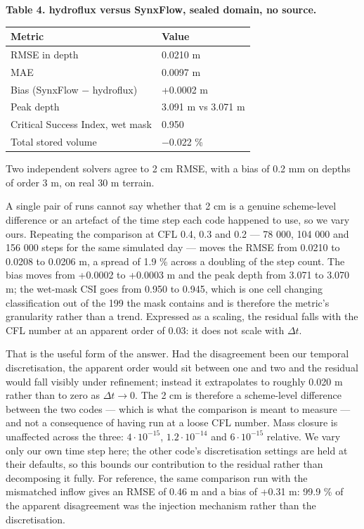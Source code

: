 \textbf{Table 4. hydroflux versus SynxFlow, sealed domain, no source.}

\begin{longtable}[]{@{}ll@{}}
\toprule\noalign{}
Metric & Value \\
\midrule\noalign{}
\endhead
\bottomrule\noalign{}
\endlastfoot
RMSE in depth & 0.0210 m \\
MAE & 0.0097 m \\
Bias (SynxFlow − hydroflux) & +0.0002 m \\
Peak depth & 3.091 m vs 3.071 m \\
Critical Success Index, wet mask & 0.950 \\
Total stored volume & −0.022 \% \\
\end{longtable}

Two independent solvers agree to 2 cm RMSE, with a bias of 0.2 mm on
depths of order 3 m, on real 30 m terrain.

A single pair of runs cannot say whether that 2 cm is a genuine
scheme-level difference or an artefact of the time step each code
happened to use, so we vary ours. Repeating the comparison at CFL 0.4,
0.3 and 0.2 --- 78 000, 104 000 and 156 000 steps for the same simulated
day --- moves the RMSE from 0.0210 to 0.0208 to 0.0206 m, a spread of
1.9 \% across a doubling of the step count. The bias moves from +0.0002
to +0.0003 m and the peak depth from 3.071 to 3.070 m; the wet-mask CSI
goes from 0.950 to 0.945, which is one cell changing classification out
of the 199 the mask contains and is therefore the metric's granularity
rather than a trend. Expressed as a scaling, the residual falls with the
CFL number at an apparent order of 0.03: it does not scale with
\(\Delta t\).

That is the useful form of the answer. Had the disagreement been our
temporal discretisation, the apparent order would sit between one and
two and the residual would fall visibly under refinement; instead it
extrapolates to roughly 0.020 m rather than to zero as
\(\Delta t \to 0\). The 2 cm is therefore a scheme-level difference
between the two codes --- which is what the comparison is meant to
measure --- and not a consequence of having run at a loose CFL number.
Mass closure is unaffected across the three: \(4\cdot 10^{-15}\),
\(1.2\cdot 10^{-14}\) and \(6\cdot 10^{-15}\) relative. We vary only our
own time step here; the other code's discretisation settings are held at
their defaults, so this bounds our contribution to the residual rather
than decomposing it fully. For reference, the same comparison run with
the mismatched inflow gives an RMSE of 0.46 m and a bias of +0.31 m:
99.9 \% of the apparent disagreement was the injection mechanism rather
than the discretisation.

